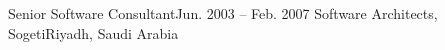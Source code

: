 \resumeSubheading
{Senior Software Consultant}{Jun. 2003 -- Feb. 2007}
{Software Architects, Sogeti}{Riyadh, Saudi Arabia}
\resumeItemListStart
\resumeItemListEnd